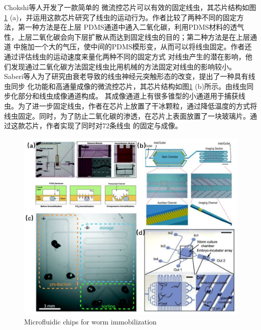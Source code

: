 	Chokshi等人\cite{Chokshi2009CO2}开发了一款简单的
	微流控芯片可以有效的固定线虫，其芯片结构如图\ref{fig:immobilization} (a)，并运用这款芯片研究了线虫的运动行为。作者比较了两种不同的固定方法，第一种方法是在上层
	PDMS通道中通入二氧化碳，利用PDMS材料的透气性，上层二氧化碳会向下层扩散从而达到固定线虫的目的；第二种方法是在上层通道
	中施加一个大的气压，使中间的PDMS模形变，从而可以将线虫固定。作者还通过评估线虫的运动速度来量化两种不同的固定方式
	对线虫产生的潜在影响，他们发现通过二氧化碳方法固定线虫比用机械的方法固定对线虫的影响较小。
	Saberi等人\cite{saberi2018microfluidic}为了研究由衰老导致的线虫神经元突触形态的改变，提出了一种具有线虫同步
	化功能和高通量成像的微流控芯片，其芯片结构如图\ref{fig:immobilization} (b)所示。由线虫同步化部分和线虫成像通道构成。
	其成像通道上有很多锥型的小通道用于捕获线虫。为了进一步固定线虫，作者在芯片上放置了干冰颗粒，通过降低温度的方式将
	线虫固定。同时，为了防止二氧化碳的渗透，在芯片上表面放置了一块玻璃片。通过这款芯片，作者实现了同时对72条线虫
	的固定与成像。
	\begin{figure}[t]
	  \centering
	  \includegraphics[width=12cm]{figure/chap1/immobilization.jpg}
		{Microfluidic chips for worm immobilization}
	  \label{fig:immobilization}
	\end{figure}
	
